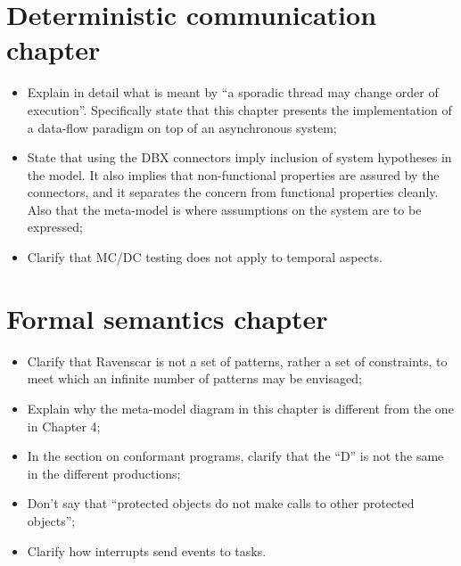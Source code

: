 \documentclass{article}
\begin{document}
\section{Deterministic communication chapter}
\begin{itemize}
\item{Explain in detail what is meant by ``a sporadic thread may
  change order of execution''. Specifically state that this chapter
  presents the implementation of a data-flow paradigm on top of an
  asynchronous system;}
\item{State that using the DBX connectors imply inclusion of system
  hypotheses in the model. It also implies that non-functional
  properties are assured by the connectors, and it separates the
  concern from functional properties cleanly. Also that the meta-model
  is where assumptions on the system are to be expressed;}
\item{Clarify that MC/DC testing does not apply to temporal aspects.}
\end{itemize}

\section{Formal semantics chapter}
\begin{itemize}
\item{Clarify that Ravenscar is not a set of patterns, rather a set of
  constraints, to meet which an infinite number of patterns may be
  envisaged;}
\item{Explain why the meta-model diagram in this chapter is different
  from the one in Chapter 4;}
\item{In the section on conformant programs, clarify that the ``D'' is
  not the same in the different productions;}
\item{Don't say that ``protected objects do not make calls to other
  protected objects'';}
\item{Clarify how interrupts send events to tasks.}
\end{itemize}
\end{document}
